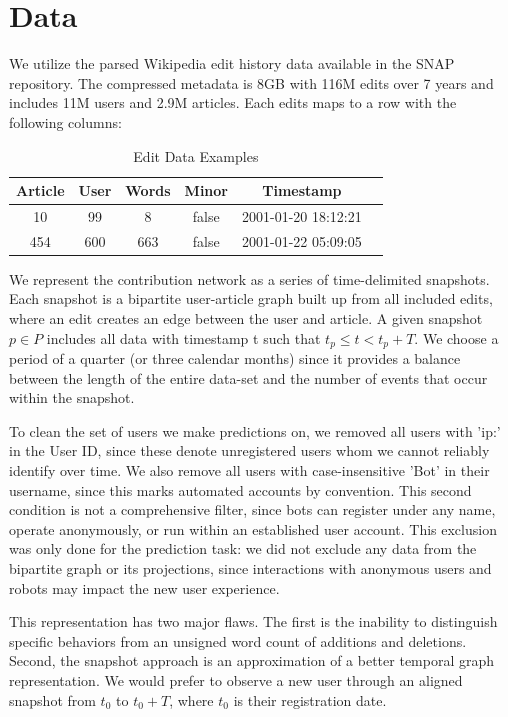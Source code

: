 \documentclass[letterpaper, 12pt, conference]{ieeeconf}
\begin{document}
\section{Data}

We utilize the parsed Wikipedia edit history data available in the SNAP repository. The compressed metadata is 8GB with 116M edits over 7 years and includes 11M users and 2.9M articles. Each edits maps to a row with the following columns:

\begin{table}[ht]
    \caption{Edit Data Examples}
    \label{tab:edit_data}
    \centering
    \begin{tabular}{c|c|c|c|c|c}
        \toprule
    Article & User & Words & Minor & Timestamp \\
        \midrule
        10 & 99 & 8 & false & 2001-01-20 18:12:21 \\
        454 & 600 & 663 & false & 2001-01-22 05:09:05 \\
        \bottomrule
    \end{tabular}
\end{table}

We represent the contribution network as a series of time-delimited snapshots. Each snapshot is a bipartite user-article graph built up from all included edits, where an edit creates an edge between the user and article. A given snapshot $p \in P$ includes all data with timestamp t such that $t_p \leq t < t_p + T $. We choose a period of a quarter (or three calendar months) since it provides a balance between the length of the entire data-set and the number of events that occur within the snapshot. 

To clean the set of users we make predictions on, we removed all users with 'ip:' in the User ID, since these denote unregistered users whom we cannot reliably identify over time. We also remove all users with case-insensitive 'Bot' in their username, since this marks automated accounts by convention. This second condition is not a comprehensive filter, since bots can register under any name, operate anonymously, or run within an established user account. This exclusion was only done for the prediction task: we did not exclude any data from the bipartite graph or its projections, since interactions with anonymous users and robots may impact the new user experience.

This representation has two major flaws. The first is the inability to distinguish specific behaviors from an unsigned word count of additions and deletions. Second, the snapshot approach is an approximation of a better temporal graph representation. We would prefer to observe a new user through an aligned snapshot from $t_0$ to $t_0+T$, where $t_0$ is their registration date.
\end{document}
